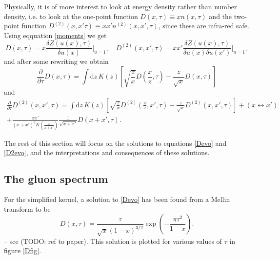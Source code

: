 \documentclass[a4paper,12pt]{article}
\newcommand{\party}[2]{\frac{\partial{#1}}{\partial{#2}}}
\numberwithin{equation}{section}
\begin{document}
Physically, it is of more interest to look at energy density rather than number density, i.e. to look at the one-point function $D(x,\tau)\equiv xn(x,\tau)$ and the two-point function $D^{(2)}(x,x'\tau)\equiv xx'n^{(2)}(x,x',\tau)$, since these are infra-red safe. Using eqquation \eqref{moments} we get
\begin{equation}
D(x,\tau)=x \frac{\delta Z(u(x),\tau)}{\delta u(x)}\Bigg|_{u=1},\quad D^{(2)}(x,x',\tau)=xx' \frac{\delta Z(u(x),\tau)}{\delta u(x)\delta u(x')}\Bigg|_{u=1},
\end{equation}
and after some rewriting we obtain
\begin{equation}\label{Devo}
\party{}{\tau}D(x,\tau)=\int \mathrm{d}z\, K(z) \left[\sqrt{\frac{z}{x}} D\left(\frac{x}{z},\tau\right)- \frac{z}{\sqrt{x}}D(x,\tau)  \right]
\end{equation}
and
\begin{multline}\label{D2evo}
\party{}{\tau}D^{(2)}(x,x',\tau)=\int \mathrm{d}z\, K(z) \left[ \sqrt{\frac{z}{x}} D^{(2)}\left(\frac{x}{z},x',\tau\right) - \frac{z}{\sqrt{x}} D^{(2)}(x,x',\tau)\right]+(x \leftrightarrow x') \\
+ \frac{xx'}{(x+x')^2 K\left(\frac{x}{x+x'}\right)} \frac{1}{\sqrt{x+x'}} D(x+x',\tau).
\end{multline}


The rest of this section will focus on the solutions to equations \eqref{Devo} and \eqref{D2evo}, and the interpretations and consequences of these solutions.

\subsection{The gluon spectrum}\label{onepoint}
For the simplified kernel, a solution to \eqref{Devo} has been found from a Mellin transform to be
\begin{equation}\label{Mellin}
D(x,\tau) = \frac{\tau}{\sqrt{x}(1-x)^{3/2}}\exp\left(-\frac{\pi \tau^2}{1-x}\right).
\end{equation}
-- see (TODO: ref to paper). This solution is plotted for various values of $\tau$ in figure \ref{Dfig}.
\end{document}
